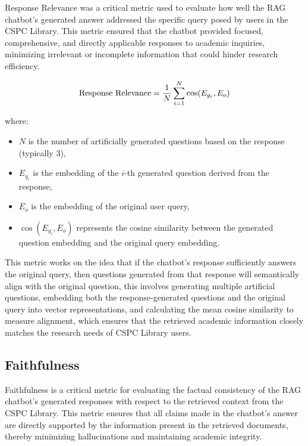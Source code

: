 \begin{refsection}
Response Relevance was a critical metric used to evaluate how well the RAG chatbot's generated answer addressed the specific query posed by users in the CSPC Library. This metric ensured that the chatbot provided focused, comprehensive, and directly applicable responses to academic inquiries, minimizing irrelevant or incomplete information that could hinder research efficiency.

\begin{equation}
\centering
\text{Response Relevance} = \frac{1}{N} \sum_{i=1}^{N} \cos(E_{g_i}, E_o)
\end{equation}

where:
\begin{itemize}
    \item $N$ is the number of artificially generated questions based on the response (typically 3),
    \item $E_{g_i}$ is the embedding of the $i$-th generated question derived from the response,
    \item $E_o$ is the embedding of the original user query,
    \item $\cos(E_{g_i}, E_o)$ represents the cosine similarity between the generated question embedding and the original query embedding.
\end{itemize}

This metric works on the idea that if the chatbot's response sufficiently answers the original query, then questions generated from that response will semantically align with the original question, this involves generating multiple artificial questions, embedding both the response-generated questions and the original query into vector representations, and calculating the mean cosine similarity to measure alignment, which ensures that the retrieved academic information closely matches the research needs of CSPC Library users.

\subsection*{Faithfulness}

Faithfulness is a critical metric for evaluating the factual consistency of the RAG chatbot's generated responses with respect to the retrieved context from the CSPC Library. This metric ensures that all claims made in the chatbot's answer are directly supported by the information present in the retrieved documents, thereby minimizing hallucinations and maintaining academic integrity.


\end{refsection}
